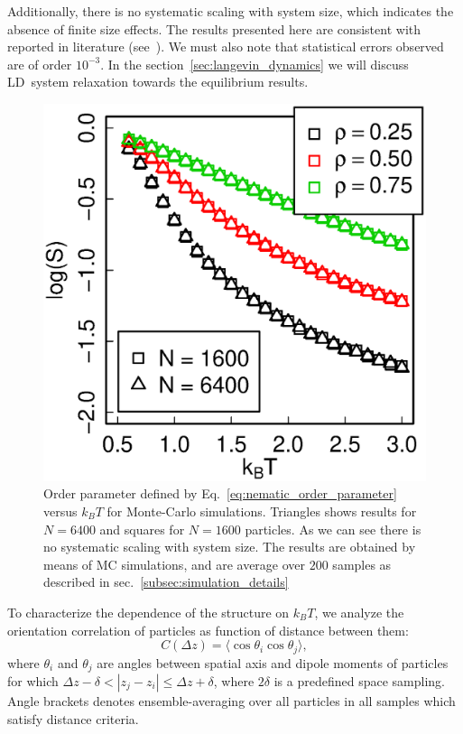 Additionally, there is no systematic scaling with system size, which indicates the absence of finite size effects. The results presented here are consistent with reported in literature (see~\cite{Marshall2015}). We must also note that statistical errors observed are of order $10^{-3}$. In the section~\ref{sec:langevin_dynamics} we will discuss LD~system relaxation towards the equilibrium results.

\begin{figure}[h]
\centering
	\includegraphics[width=0.7\columnwidth]{Images/op_eq_log}
	\captionsetup{justification=centering, width=0.9\columnwidth}
	\caption{Order parameter defined by Eq.~\eqref{eq:nematic_order_parameter} versus $k_BT$ for Monte-Carlo simulations. Triangles shows results for $N = 6400$ and squares for $N = 1600$ particles. As we can see there is no systematic scaling with system size. The results are obtained by means of MC simulations, and are average over $200$ samples as described in sec.~\ref{subsec:simulation_details}}
	\label{fig:op_kbt}
\end{figure}

To characterize the dependence of the structure on $k_BT$, we analyze the orientation correlation of particles as function of distance between them:
\begin{equation}
\label{eq:distance_correlation}
	C(\Delta z) = \langle\cos \theta_i \cos \theta_j\rangle
	,
\end{equation}
where $\theta_i$ and $\theta_j$ are angles between spatial axis and dipole moments of particles for which $\Delta z - \delta < |z_j - z_i| \leq \Delta z + \delta$, where $2\delta$ is a predefined space sampling. Angle brackets denotes ensemble-averaging over all particles in all samples which satisfy distance criteria.

